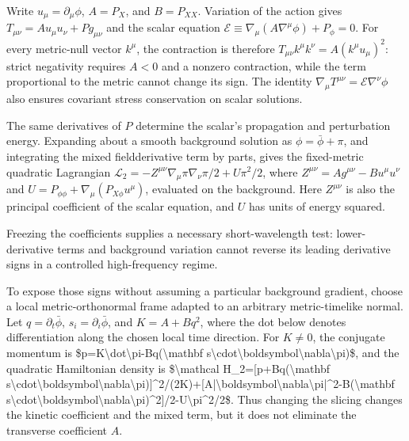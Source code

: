 \documentclass[11pt]{article}
\begin{document}
Write $u_\mu=\partial_\mu\phi$, $A=P_X$, and $B=P_{XX}$. Variation of the action gives $T_{\mu\nu}=A u_\mu u_\nu+P g_{\mu\nu}$ and the scalar equation $\mathcal E\equiv\nabla_\mu(A\nabla^\mu\phi)+P_\phi=0$. For every metric-null vector $k^\mu$, the contraction is therefore $T_{\mu\nu}k^\mu k^\nu=A(k^\mu u_\mu)^2$: strict negativity requires $A<0$ and a nonzero contraction, while the term proportional to the metric cannot change its sign. The identity $\nabla_\mu T^{\mu\nu}=\mathcal E\nabla^\nu\phi$ also ensures covariant stress conservation on scalar solutions.

The same derivatives of $P$ determine the scalar\textquoteright{}s propagation and perturbation energy. Expanding about a smooth background solution as $\phi=\bar\phi+\pi$, and integrating the mixed field\textendash{}derivative term by parts, gives the fixed-metric quadratic Lagrangian $\mathcal L_2=-Z^{\mu\nu}\nabla_\mu\pi\nabla_\nu\pi/2+U\pi^2/2$, where $Z^{\mu\nu}=A g^{\mu\nu}-B u^\mu u^\nu$ and $U=P_{\phi\phi}+\nabla_\mu(P_{X\phi}u^\mu)$, evaluated on the background. Here $Z^{\mu\nu}$ is also the principal coefficient of the scalar equation, and $U$ has units of energy squared.

Freezing the coefficients supplies a necessary short-wavelength test: lower-derivative terms and background variation cannot reverse its leading derivative signs in a controlled high-frequency regime.

To expose those signs without assuming a particular background gradient, choose a local metric-orthonormal frame adapted to an arbitrary metric-timelike normal. Let $q=\partial_t\bar\phi$, $s_i=\partial_i\bar\phi$, and $K=A+Bq^2$, where the dot below denotes differentiation along the chosen local time direction. For $K\ne0$, the conjugate momentum is \$p=K\textbackslash{}dot\textbackslash{}pi-Bq(\textbackslash{}mathbf s\textbackslash{}cdot\textbackslash{}boldsymbol\textbackslash{}nabla\textbackslash{}pi)\$, and the quadratic Hamiltonian density is \$\textbackslash{}mathcal H\_2=[p+Bq(\textbackslash{}mathbf s\textbackslash{}cdot\textbackslash{}boldsymbol\textbackslash{}nabla\textbackslash{}pi)]\textasciicircum{}2/(2K)+[A|\textbackslash{}boldsymbol\textbackslash{}nabla\textbackslash{}pi|\textasciicircum{}2-B(\textbackslash{}mathbf s\textbackslash{}cdot\textbackslash{}boldsymbol\textbackslash{}nabla\textbackslash{}pi)\textasciicircum{}2]/2-U\textbackslash{}pi\textasciicircum{}2/2\$. Thus changing the slicing changes the kinetic coefficient and the mixed term, but it does not eliminate the transverse coefficient $A$.
\end{document}
